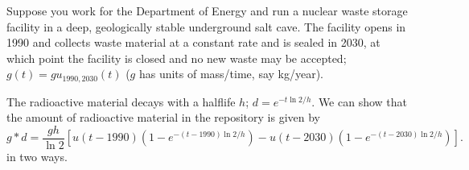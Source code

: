 \documentclass[answers]{exam}\newcommand{\repositoryInformationSetup}{     \usepackage[dvipsnames]{xcolor}     \usepackage[ angle=90, color=black, opacity=1, scale=2, ]{background}      \SetBgPosition{current page.west}      \SetBgVshift{-4.5mm}      \backgroundsetup{contents={{\color{green}\texttt{-{}-} differs from commit \texttt{40a9b87} in 0 files}}} } \newcommand{\commit}{{{\color{green}40a9b87}}}\usepackage{amsmath}
\providecommand{\id}{}
\renewcommand{\id}[1]{\ensuremath{\; \mathrm{d}#1}}
\begin{document}
\begin{questions}

\question Suppose you work for the Department of Energy and run a nuclear waste storage facility in a deep, geologically stable underground salt cave.
The facility opens in 1990 and collects waste material at a constant rate and is sealed in 2030, at which point the facility is closed and no new waste may be accepted; $g(t) = g u_{1990,2030}(t)$ ($g$ has units of mass/time, say kg/year).

The radioactive material decays with a halflife $h$; $d=e^{-t \ln 2/h}$.
We can show that the amount of radioactive material in the repository is given by
\begin{equation}
g*d = \frac{gh}{\ln 2} \left[u(t-1990)\left(1-e^{-(t-1990) \ln 2/h} \right)- u(t-2030)\left(1-e^{-(t-2030) \ln 2 / h}\right)\right].
\end{equation}
in two ways.


\end{questions}
\end{document}
